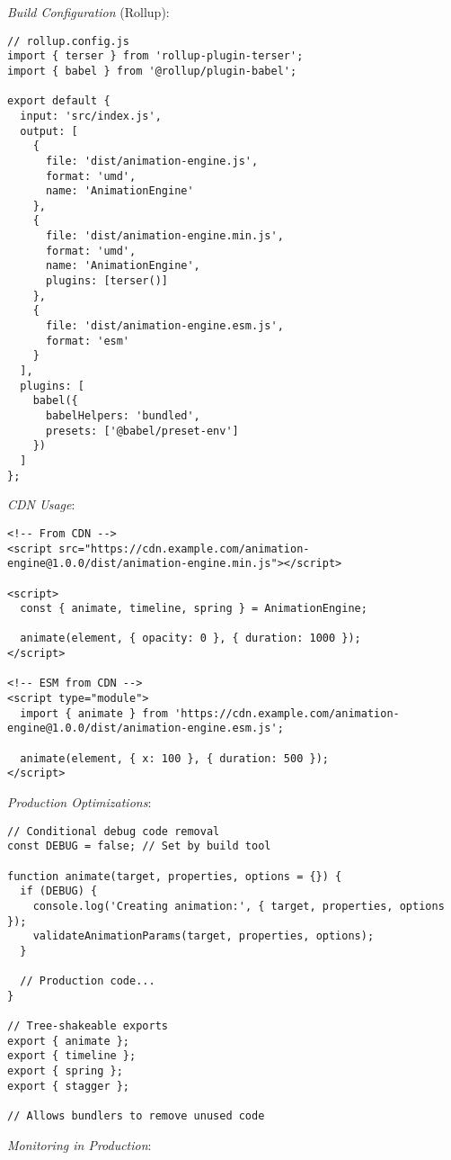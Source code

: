 \documentclass[11pt]{article}
\begin{document}
\emph{Build Configuration} (Rollup):

\begin{verbatim}
// rollup.config.js
import { terser } from 'rollup-plugin-terser';
import { babel } from '@rollup/plugin-babel';

export default {
  input: 'src/index.js',
  output: [
    {
      file: 'dist/animation-engine.js',
      format: 'umd',
      name: 'AnimationEngine'
    },
    {
      file: 'dist/animation-engine.min.js',
      format: 'umd',
      name: 'AnimationEngine',
      plugins: [terser()]
    },
    {
      file: 'dist/animation-engine.esm.js',
      format: 'esm'
    }
  ],
  plugins: [
    babel({
      babelHelpers: 'bundled',
      presets: ['@babel/preset-env']
    })
  ]
};
\end{verbatim}

\emph{CDN Usage}:

\begin{verbatim}
<!-- From CDN -->
<script src="https://cdn.example.com/animation-engine@1.0.0/dist/animation-engine.min.js"></script>

<script>
  const { animate, timeline, spring } = AnimationEngine;
  
  animate(element, { opacity: 0 }, { duration: 1000 });
</script>

<!-- ESM from CDN -->
<script type="module">
  import { animate } from 'https://cdn.example.com/animation-engine@1.0.0/dist/animation-engine.esm.js';
  
  animate(element, { x: 100 }, { duration: 500 });
</script>
\end{verbatim}

\emph{Production Optimizations}:

\begin{verbatim}
// Conditional debug code removal
const DEBUG = false; // Set by build tool

function animate(target, properties, options = {}) {
  if (DEBUG) {
    console.log('Creating animation:', { target, properties, options });
    validateAnimationParams(target, properties, options);
  }
  
  // Production code...
}

// Tree-shakeable exports
export { animate };
export { timeline };
export { spring };
export { stagger };

// Allows bundlers to remove unused code
\end{verbatim}

\emph{Monitoring in Production}:
\end{document}
